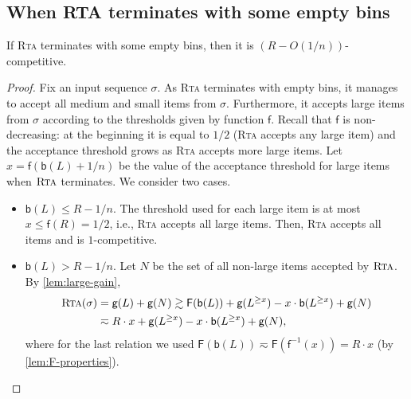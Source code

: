 \documentclass[a4paper,USenglish,cleveref]{lipics-v2019}
\newcommand{\R}{\ensuremath{R}}
\newcommand{\LG}{\ensuremath{L}\xspace}
\newcommand{\f}{\textsf{f}}
\newcommand{\fintegral}{\textsf{F}}
\newcommand{\B}{\textsf{b}}
\newcommand{\gain}{\textsf{g}}
\newcommand{\ALG}{\textsc{Rta}\xspace}
\begin{document}

\subsection{When RTA terminates with some empty bins}


\begin{lemma}
\label{lem:empty}
If \ALG terminates with some empty bins, then it is $(R - O(1/n))$-competitive. 
\end{lemma}

\begin{proof}
Fix an input sequence $\sigma$. As \ALG terminates with empty bins, it manages to 
accept all medium and small items from $\sigma$. Furthermore, it accepts large 
items from $\sigma$ according to the thresholds given by function $\f$.
Recall that $\f$ is non-decreasing: at the beginning it is equal to
$1/2$ (\ALG accepts any large item) and the acceptance threshold 
grows as \ALG accepts more large items. 
Let $x = \f(\B(\LG)+1/n)$ be the value of the acceptance
threshold for large items when $\ALG$ terminates.
We consider two cases. 

\begin{itemize}
\item $\B(\LG) \leq \R - 1/n$.
The threshold used for each large item is at most $x \leq \f(\R) = 1/2$, i.e.,
\ALG accepts all large items. Then, \ALG accepts all items and is
$1$-competitive.

\item $\B(\LG) > \R - 1/n$.
Let $N$ be the set of all non-large items accepted by $\ALG$. 
By \cref{lem:large-gain}, 
\begin{align*}
    \ALG(\sigma) 
    & = \gain(\LG) + \gain(N) 
    \gtrsim \fintegral(\B(\LG)) + \gain(\LG^{\geq x}) - x \cdot \B(\LG^{\geq x}) + \gain(N) \\
    & \eqsim R \cdot x + \gain(\LG^{\geq x}) - x \cdot \B(\LG^{\geq x}) + \gain(N),
\end{align*}  
where for the last relation we used $\fintegral(\B(\LG)) \eqsim \fintegral(\f^{-1}(x)) = \R \cdot x$ 
(by \cref{lem:F-properties}).


\end{itemize}
\end{proof}
\end{document}
